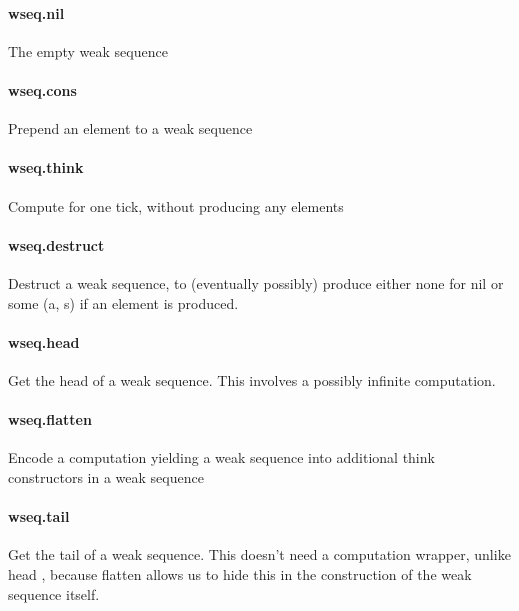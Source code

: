 \documentclass{article}
\begin{document}
\paragraph{wseq.nil}
\par
The empty weak sequence
\paragraph{wseq.cons}
\par
Prepend an element to a weak sequence
\paragraph{wseq.think}
\par
Compute for one tick, without producing any elements
\paragraph{wseq.destruct}
\par
Destruct a weak sequence, to (eventually possibly) produce either
\colorbox[RGB]{253,246,227}{{{{\color[RGB]{101, 123, 131} none }}}} for 
\colorbox[RGB]{253,246,227}{{{{\color[RGB]{101, 123, 131} nil }}}} or 
\colorbox[RGB]{253,246,227}{{{{\color[RGB]{101, 123, 131} some (a, s) }}}} if an element is produced.
\paragraph{wseq.head}
\par
Get the head of a weak sequence. This involves a possibly
infinite computation.
\paragraph{wseq.flatten}
\par
Encode a computation yielding a weak sequence into additional
\colorbox[RGB]{253,246,227}{{{{\color[RGB]{101, 123, 131} think }}}} constructors in a weak sequence
\paragraph{wseq.tail}
\par
Get the tail of a weak sequence. This doesn't need a 
\colorbox[RGB]{253,246,227}{{{{\color[RGB]{101, 123, 131} computation }}}}wrapper, unlike 
\colorbox[RGB]{253,246,227}{{{{\color[RGB]{101, 123, 131} head }}}}, because 
\colorbox[RGB]{253,246,227}{{{{\color[RGB]{101, 123, 131} flatten }}}} allows us to hide this
in the construction of the weak sequence itself.
\end{document}
